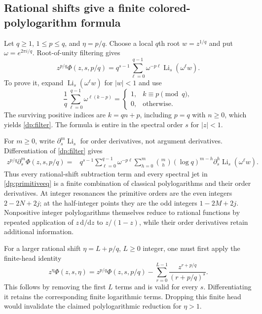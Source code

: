 \documentclass[11pt,a4paper]{article}
\numberwithin{equation}{section}
\theoremstyle{definition}
\theoremstyle{remark}
\DeclareMathOperator{\Li}{Li}
\begin{document}
\subsection{Rational shifts give a finite colored-polylogarithm formula}
Let $q\ge1$, $1\le p\le q$, and $\eta=p/q$. Choose a local $q$th
root $w=z^{1/q}$ and put $\omega=e^{2\pi i/q}$. Root-of-unity
filtering gives
\begin{equation}\label{dp:filter}
 \boxed{z^{p/q}\Phi(z,s,p/q)
       =q^{s-1}\sum_{\ell=0}^{q-1}
                     \omega^{-p\ell}\Li_s(\omega^\ell w).}
\end{equation}
To prove it, expand $\Li_s(\omega^\ell w)$ for $|w|<1$ and use
\[
 \frac1q\sum_{\ell=0}^{q-1}\omega^{\ell(k-p)}
 =\begin{cases}1,&k\equiv p\pmod q,\\0,&\text{otherwise}.
   \end{cases}
\]
The surviving positive indices are $k=qn+p$, including $p=q$ with
$n\ge0$, which yields \eqref{dp:filter}. The formula is entire in
the spectral order $s$ for $|z|<1$.

For $m\ge0$, write $\partial_s^m\Li_s$ for order derivatives, not
argument derivatives. Differentiation of \eqref{dp:filter} gives
\begin{align}
 z^{p/q}\partial_s^m\Phi(z,s,p/q)
 ={}&q^{s-1}\sum_{\ell=0}^{q-1}\omega^{-p\ell}
 \sum_{h=0}^m\binom mh(\log q)^{m-h}
              \partial_s^h\Li_s(\omega^\ell w).
 \label{dp:filterjets}
\end{align}
Thus every rational-shift subtraction term and every spectral jet
in \eqref{dp:primitiveeq} is a finite combination of classical
polylogarithms and their order derivatives. At integer resonances the
primitive orders are the even integers $2-2N+2j$; at the half-integer
points they are the odd integers $1-2M+2j$. Nonpositive integer
polylogarithms themselves reduce to rational functions by repeated
application of $z\,\mathrm d/\mathrm dz$ to $z/(1-z)$, while their
order derivatives retain additional information.

For a larger rational shift $\eta=L+p/q$, $L\ge0$ integer,
one must first apply the finite-head identity
\begin{equation}\label{dp:shift}
 z^\eta\Phi(z,s,\eta)
 =z^{p/q}\Phi(z,s,p/q)
       -\sum_{r=0}^{L-1}\frac{z^{r+p/q}}{(r+p/q)^s}.
\end{equation}
This follows by removing the first $L$ terms and is valid for every
$s$. Differentiating it retains the corresponding finite logarithmic
terms. Dropping this finite head would invalidate the claimed
polylogarithmic reduction for $\eta>1$.
\end{document}
